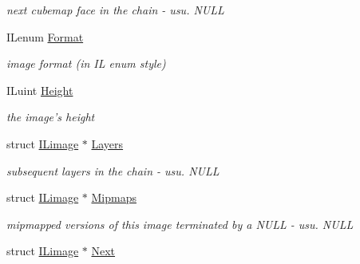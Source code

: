 \begin{DoxyCompactItemize}
\begin{DoxyCompactList}\small\item\em next cubemap face in the chain -\/ usu. N\-U\-L\-L \end{DoxyCompactList}\item 
\hypertarget{struct_i_limage_aab6d023e52ab2d90be412df75a42abfb}{I\-Lenum \hyperlink{struct_i_limage_aab6d023e52ab2d90be412df75a42abfb}{Format}}\label{struct_i_limage_aab6d023e52ab2d90be412df75a42abfb}

\begin{DoxyCompactList}\small\item\em image format (in I\-L enum style) \end{DoxyCompactList}\item 
\hypertarget{struct_i_limage_a8a8093d76b61a95fc96df24af29b107a}{I\-Luint \hyperlink{struct_i_limage_a8a8093d76b61a95fc96df24af29b107a}{Height}}\label{struct_i_limage_a8a8093d76b61a95fc96df24af29b107a}

\begin{DoxyCompactList}\small\item\em the image's height \end{DoxyCompactList}\item 
\hypertarget{struct_i_limage_ab9677b31b029dff8fecf52eef54223e8}{struct \hyperlink{struct_i_limage}{I\-Limage} $\ast$ \hyperlink{struct_i_limage_ab9677b31b029dff8fecf52eef54223e8}{Layers}}\label{struct_i_limage_ab9677b31b029dff8fecf52eef54223e8}

\begin{DoxyCompactList}\small\item\em subsequent layers in the chain -\/ usu. N\-U\-L\-L \end{DoxyCompactList}\item 
\hypertarget{struct_i_limage_a7ebe7b0ac80e0ff043b4339aec9bd202}{struct \hyperlink{struct_i_limage}{I\-Limage} $\ast$ \hyperlink{struct_i_limage_a7ebe7b0ac80e0ff043b4339aec9bd202}{Mipmaps}}\label{struct_i_limage_a7ebe7b0ac80e0ff043b4339aec9bd202}

\begin{DoxyCompactList}\small\item\em mipmapped versions of this image terminated by a N\-U\-L\-L -\/ usu. N\-U\-L\-L \end{DoxyCompactList}\item 
\hypertarget{struct_i_limage_a996f4ecbbfd30cc5868deb90cca0bf39}{struct \hyperlink{struct_i_limage}{I\-Limage} $\ast$ \hyperlink{struct_i_limage_a996f4ecbbfd30cc5868deb90cca0bf39}{Next}}\label{struct_i_limage_a996f4ecbbfd30cc5868deb90cca0bf39}


\end{DoxyCompactItemize}
